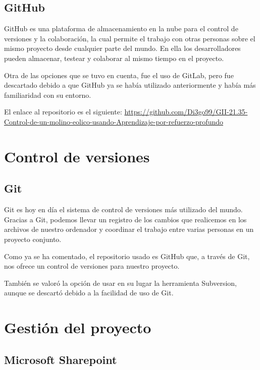 \subsection{GitHub}

GitHub\cite{GitHub} es una plataforma de almacenamiento en la nube para el control de versiones y la colaboración, la cual permite el trabajo con otras personas sobre el mismo proyecto desde cualquier parte del mundo. En ella los desarrolladores pueden almacenar, testear y colaborar al mismo tiempo en el proyecto.

Otra de las opciones que se tuvo en cuenta, fue el uso de GitLab, pero fue descartado debido a que GitHub ya se había utilizado anteriormente y había más familiaridad con su entorno.

El enlace al repositorio es el siguiente:
\href{https://github.com/Di3go99/GII-21.35-Control-de-un-molino-eolico-usando-Aprendizaje-por-refuerzo-profundo}{https://github.com/Di3go99/GII-21.35-Control-de-un-molino-eolico-usando-Aprendizaje-por-refuerzo-profundo}


\section{Control de versiones}

\subsection{Git}

Git\cite{Git} es hoy en día el sistema de control de versiones más utilizado del mundo. Gracias a Git, podemos llevar un registro de los cambios que realicemos en los archivos de nuestro ordenador y coordinar el trabajo entre varias personas en un proyecto conjunto.

Como ya se ha comentado, el repositorio usado es GitHub que, a través de Git, nos ofrece un control de versiones para nuestro proyecto. 

También se valoró la opción de usar en su lugar la herramienta Subversion, aunque se descartó debido a la facilidad de uso de Git. 


\section{Gestión del proyecto}

\subsection{Microsoft Sharepoint}


